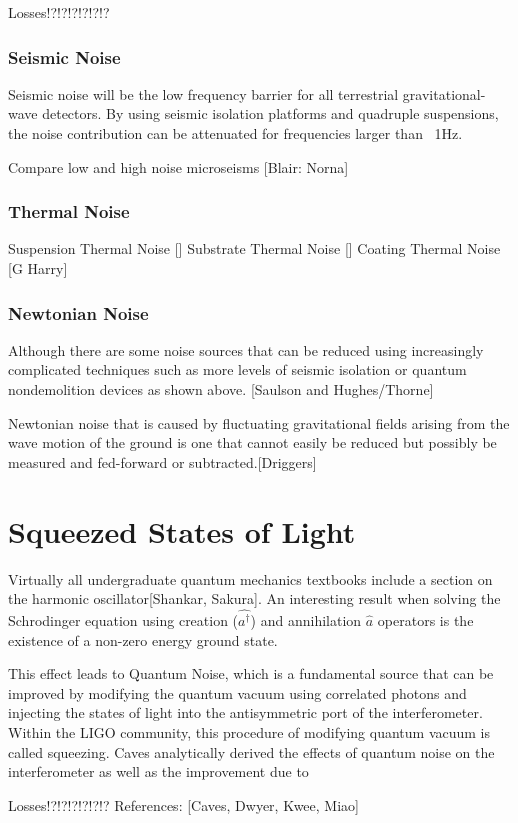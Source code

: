 		Losses!?!?!?!?!?!?
		
		\subsubsection{Seismic Noise}
		Seismic noise will be the low frequency barrier for all terrestrial gravitational-wave detectors.  By using seismic isolation platforms and quadruple suspensions, the noise contribution can be attenuated for frequencies larger than ~1Hz.
		
		Compare low and high noise microseisms
		[Blair: Norna]
		
		\subsubsection{Thermal Noise}
		Suspension Thermal Noise [\cite{SaulsonThermal}]
		Substrate Thermal Noise [\cite{Saulson}]
		Coating Thermal Noise [G Harry]
		
		\subsubsection{Newtonian Noise}
		Although there are some noise sources that can be reduced using increasingly complicated techniques such as more levels of seismic isolation or quantum nondemolition devices as shown above. [Saulson and Hughes/Thorne]
		
		Newtonian noise that is caused by fluctuating gravitational fields arising from the wave motion of the ground is one that cannot easily be reduced but possibly be measured and fed-forward or subtracted.[Driggers]
		
	
	\section{Squeezed States of Light}

	Virtually all undergraduate quantum mechanics textbooks include a section on the harmonic oscillator[Shankar, Sakura].  An interesting result when solving the Schrodinger equation using creation ($\hat{a^{\dagger}}$) and annihilation $\hat{a}$ operators is the existence of a non-zero energy ground state. 
	
	This effect leads to Quantum Noise, which is a fundamental source that can be improved by modifying the quantum vacuum using correlated photons and injecting the states of light into the antisymmetric port of the interferometer.  Within the LIGO community, this procedure of modifying quantum vacuum is called squeezing. Caves analytically derived the effects of quantum noise on the interferometer as well as the improvement due to	
	
	Losses!?!?!?!?!?!?
	References: [Caves, Dwyer, Kwee, Miao]
	